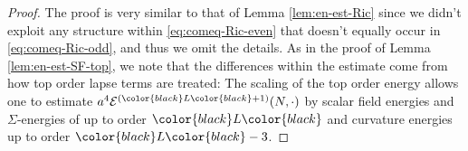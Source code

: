 \documentclass[11pt,leqno,textwidth=10cm]{amsart}
\numberwithin{equation}{section}
\theoremstyle{definition}
\theoremstyle{plain}
\newcommand{\1}{\mathbbm{1}}
\newcommand{\E}{\mathcal{E}}
\newcommand{\Ric}{\text{\normalfont{Ric}}}
\renewcommand{\epsilon}{\varepsilon}
\newcommand{\del}{\partial}
\newcommand{\change}[1]{\color{black}#1\color{black}}
\begin{document}
\begin{proof}
The proof is very similar to that of Lemma \ref{lem:en-est-Ric} since we didn't exploit any structure within \eqref{eq:comeq-Ric-even} that doesn't equally occur in \eqref{eq:comeq-Ric-odd}, and thus we omit the details. As in the proof of Lemma \ref{lem:en-est-SF-top}, we note that the differences within the estimate come from how top order lapse terms are treated: The scaling of the top order energy allows one to estimate $a^4\E^{(\change{L}+1)}(N,\cdot)$ by scalar field energies and $\Sigma$-energies of up to order $\change{L}$ and curvature energies up to order $\change{L}-3$.

\end{proof}
\end{document}
